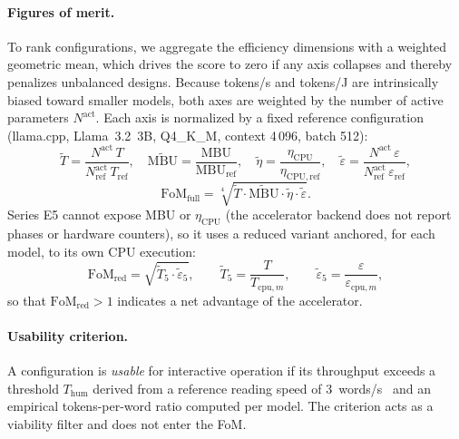 \documentclass[acmsmall,natbib=false]{acmart}
\begin{document}
\paragraph{Figures of merit.}
To rank configurations, we aggregate the efficiency dimensions with a
weighted geometric mean, which drives the score to zero if any axis collapses
and thereby penalizes unbalanced designs. Because tokens/s and tokens/J are
intrinsically biased toward smaller models, both axes are weighted by the
number of active parameters $N^{\mathrm{act}}$. Each axis is normalized by a
fixed reference configuration (llama.cpp, Llama~3.2~3B, Q4\_K\_M, context
4\,096, batch 512):
\begin{equation}
  \tilde{T} = \frac{N^{\mathrm{act}}\,T}{N^{\mathrm{act}}_{\mathrm{ref}}\,T_{\mathrm{ref}}},\quad
  \widetilde{\mathrm{MBU}} = \frac{\mathrm{MBU}}{\mathrm{MBU}_{\mathrm{ref}}},\quad
  \tilde{\eta} = \frac{\eta_{\mathrm{CPU}}}{\eta_{\mathrm{CPU,ref}}},\quad
  \tilde{\varepsilon} = \frac{N^{\mathrm{act}}\,\varepsilon}{N^{\mathrm{act}}_{\mathrm{ref}}\,\varepsilon_{\mathrm{ref}}} ,
\end{equation}
\begin{equation}
  \mathrm{FoM}_{\mathrm{full}} =
  \sqrt[4]{\tilde{T}\cdot\widetilde{\mathrm{MBU}}\cdot\tilde{\eta}\cdot\tilde{\varepsilon}} .
  \label{eq:fom_full}
\end{equation}
Series E5 cannot expose MBU or $\eta_{\mathrm{CPU}}$ (the accelerator backend
does not report phases or hardware counters), so it uses a reduced variant
anchored, for each model, to its own CPU execution:
\begin{equation}
  \mathrm{FoM}_{\mathrm{red}} = \sqrt{\tilde{T}_{5}\cdot\tilde{\varepsilon}_{5}},
  \qquad
  \tilde{T}_{5} = \frac{T}{T_{\mathrm{cpu},m}},\qquad
  \tilde{\varepsilon}_{5} = \frac{\varepsilon}{\varepsilon_{\mathrm{cpu},m}} ,
  \label{eq:fom_red}
\end{equation}
so that $\mathrm{FoM}_{\mathrm{red}}>1$ indicates a net advantage of the
accelerator.

\paragraph{Usability criterion.}
A configuration is \emph{usable} for interactive operation if its throughput
exceeds a threshold $T_{\mathrm{hum}}$ derived from a reference reading speed
of 3~words/s~\cite{whatmough_generative_2025} and an empirical
tokens-per-word ratio computed per model. The criterion acts as a viability
filter and does not enter the FoM.
\end{document}
